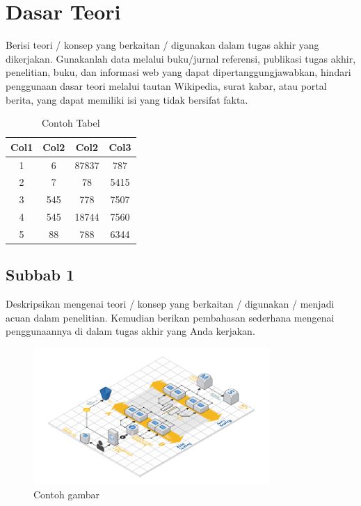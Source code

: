 \section{Dasar Teori} \label{II.Teori}
Berisi teori / konsep yang berkaitan / digunakan dalam tugas akhir yang dikerjakan. Gunakanlah data melalui buku/jurnal referensi, publikasi tugas akhir, penelitian, buku, dan informasi web yang dapat dipertanggungjawabkan, hindari penggunaan dasar teori melalui tautan Wikipedia, surat kabar, atau portal berita, yang dapat memiliki isi yang tidak bersifat fakta. \par

\begin{longtable}{|c|c|c|c|}
	\caption{Contoh Tabel}
	\label{table:2.contoh}\\
	\hline
	Col1 & Col2 & Col2 & Col3 \\
	\hline
	\endhead
	1 & 6 & 87837 & 787 \\ 
	\hline
	2 & 7 & 78 & 5415 \\
	\hline
	3 & 545 & 778 & 7507 \\
	\hline
	4 & 545 & 18744 & 7560 \\
	\hline
	5 & 88 & 788 & 6344 \\
	\hline
\end{longtable}

\subsection{Subbab 1} \label{II.Subbab1}
Deskripsikan mengenai teori / konsep yang berkaitan / digunakan / menjadi acuan dalam penelitian. Kemudian berikan pembahasan sederhana mengenai penggunaannya di dalam tugas akhir yang Anda kerjakan. \par

\begin{figure}[h]
    \centering
    \includegraphics[width=0.8\textwidth]{figure/chapter-2-infrastructure-diagram.png}
    \caption{Contoh gambar}
    \label{fig:2.contoh}
\end{figure}

